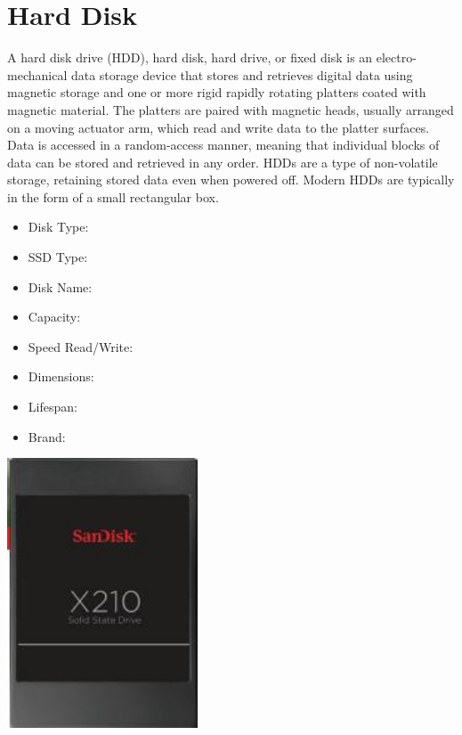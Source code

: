 \documentclass{article}
\begin{document}
\section{Hard Disk}
A hard disk drive (HDD), hard disk, hard drive, or fixed disk is an electro-mechanical data storage device that stores and retrieves digital data using magnetic storage and one or more rigid rapidly rotating platters coated with magnetic material. The platters are paired with magnetic heads, usually arranged on a moving actuator arm, which read and write data to the platter surfaces. Data is accessed in a random-access manner, meaning that individual blocks of data can be stored and retrieved in any order. HDDs are a type of non-volatile storage, retaining stored data even when powered off. Modern HDDs are typically in the form of a small rectangular box.
\begin{itemize}
  \item Disk Type:
  \item SSD Type:
  \item Disk Name:
  \item Capacity:
  \item Speed Read/Write:
  \item Dimensions:
  \item Lifespan:
  \item Brand:
\end{itemize}
\href{https://www.mouser.com/datasheet/2/669/SanDisk_DataSheet_X210_08_06_13-805929.pdf}{\includegraphics[height=8cm]{SSD.jpg}} 
\end{document}
